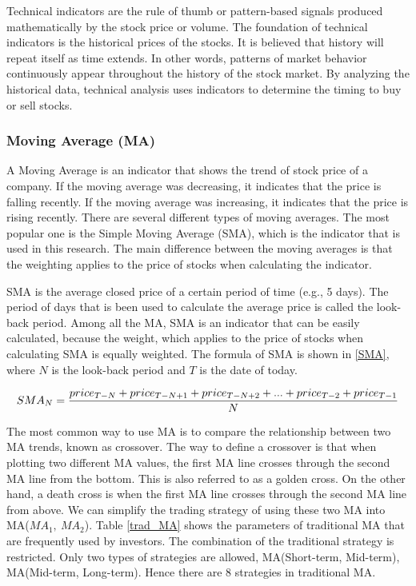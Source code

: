 \documentclass[../Proposed Method.tex]{subfiles}
\begin{document}
Technical indicators are the rule of thumb or pattern-based signals produced mathematically by the stock price or volume. The foundation of technical indicators is the historical prices of the stocks. It is believed that history will repeat itself as time extends. In other words, patterns of market behavior continuously appear throughout the history of the stock market. By analyzing the historical data, technical analysis uses indicators to determine the timing to buy or sell stocks.

\subsubsection{Moving Average (MA)}

A Moving Average is an indicator that shows the trend of stock price of a company. If the moving average was decreasing, it indicates that the price is falling recently. If the moving average was increasing, it indicates that the price is rising recently. There are several different types of moving averages. The most popular one is the Simple Moving Average (SMA), which is the indicator that is used in this research. The main difference between the moving averages is that the weighting applies to the price of stocks when calculating the indicator.

\bigbreak

SMA is the average closed price of a certain period of time (e.g., 5 days). The period of days that is been used to calculate the average price is called the look-back period. Among all the MA, SMA is an indicator that can be easily calculated, because the weight, which applies to the price of stocks when calculating SMA is equally weighted. The formula of SMA is shown in \ref{SMA}, where $N$ is the look-back period and $T$ is the date of today.

\begin{equation}
    \label{SMA}
    \scalebox{1}
    {$SMA_{N} = \dfrac{price_{T-N}+price_{T-N+1}+price_{T-N+2}+...+price_{T-2}+price_{T-1}}{N}$}
\end{equation}

The most common way to use MA is to compare the relationship between two MA trends, known as crossover. The way to define a crossover is that when plotting two different MA values, the first MA line crosses through the second MA line from the bottom. This is also referred to as a golden cross. On the other hand, a death cross is when the first MA line crosses through the second MA line from above. We can simplify the trading strategy of using these two MA into MA($MA_{1},\ MA_{2}$). Table \ref{trad_MA} shows the parameters of traditional MA that are frequently used by investors. The combination of the traditional strategy is restricted. Only two types of strategies are allowed, MA(Short-term, Mid-term), MA(Mid-term, Long-term). Hence there are 8 strategies in traditional MA.
\end{document}
